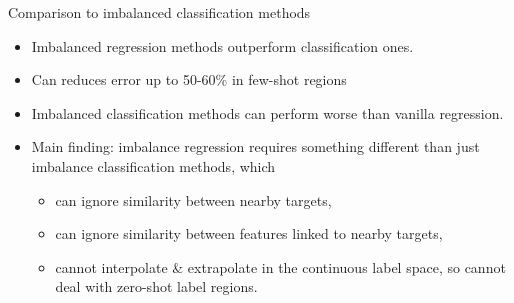 \begin{frame}{Comparison to imbalanced classification methods}
\begin{table}[ht]
\begin{center}
{			}
		\end{center}
	\end{table}
	\begin{itemize}
		\item Imbalanced regression methods outperform classification ones.
		\item Can reduces error up to 50-60\% in few-shot regions
		\item Imbalanced classification methods can perform worse than vanilla regression.
		\item Main finding: imbalance regression requires something different than just imbalance classification methods, which
		\begin{itemize}
			\item can ignore similarity between nearby targets,
			\item can ignore similarity between features linked to nearby targets,
			\item cannot interpolate \& extrapolate in the continuous label space, so cannot deal with zero-shot label regions.
		\end{itemize}
	\end{itemize}
\end{frame}